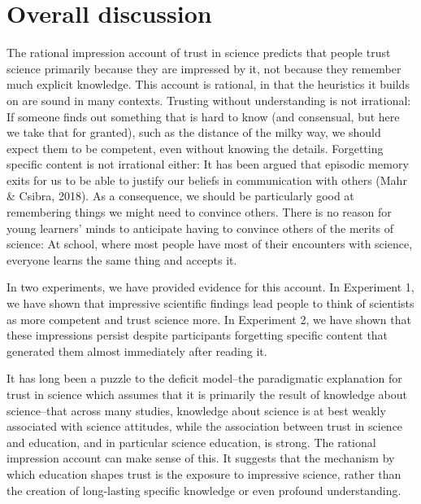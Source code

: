 \documentclass[
  doc,floatsintext]{apa6}
\begin{document}
\section{Overall discussion}\label{overall-discussion}

The rational impression account of trust in science predicts that people trust science primarily because they are impressed by it, not because they remember much explicit knowledge. This account is rational, in that the heuristics it builds on are sound in many contexts. Trusting without understanding is not irrational: If someone finds out something that is hard to know (and consensual, but here we take that for granted), such as the distance of the milky way, we should expect them to be competent, even without knowing the details. Forgetting specific content is not irrational either: It has been argued that episodic memory exits for us to be able to justify our beliefs in communication with others (Mahr \& Csibra, 2018). As a consequence, we should be particularly good at remembering things we might need to convince others. There is no reason for young learners' minds to anticipate having to convince others of the merits of science: At school, where most people have most of their encounters with science, everyone learns the same thing and accepts it.

In two experiments, we have provided evidence for this account. In Experiment 1, we have shown that impressive scientific findings lead people to think of scientists as more competent and trust science more. In Experiment 2, we have shown that these impressions persist despite participants forgetting specific content that generated them almost immediately after reading it.

It has long been a puzzle to the deficit model--the paradigmatic explanation for trust in science which assumes that it is primarily the result of knowledge about science--that across many studies, knowledge about science is at best weakly associated with science attitudes, while the association between trust in science and education, and in particular science education, is strong. The rational impression account can make sense of this. It suggests that the mechanism by which education shapes trust is the exposure to impressive science, rather than the creation of long-lasting specific knowledge or even profound understanding.
\end{document}
